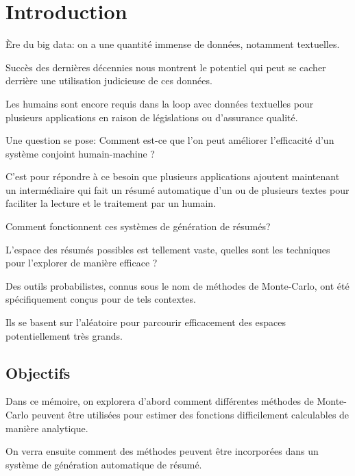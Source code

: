 \chapter*{Introduction}
\label{chap:introduction}       %


Ère du big data: on a une quantité immense de données, notamment textuelles.

Succès des dernières décennies nous montrent le potentiel qui peut se cacher
derrière une utilisation judicieuse de ces données.

Les humains sont encore requis dans la loop avec données textuelles pour
plusieurs applications en raison de législations ou d'assurance qualité.

Une question se pose: Comment est-ce que l'on peut améliorer l'efficacité d'un système
conjoint humain-machine ?

C'est pour répondre à ce besoin que plusieurs applications ajoutent maintenant
un intermédiaire qui fait un résumé automatique d'un ou de plusieurs textes pour
faciliter la lecture et le traitement par un humain.

Comment fonctionnent ces systèmes de génération de résumés?

L'espace des résumés possibles est tellement vaste, quelles sont les techniques pour
l'explorer de manière efficace ?

Des outils probabilistes, connus sous le nom de méthodes de Monte-Carlo, ont été
spécifiquement conçus pour de tels contextes.

Ils se basent sur l'aléatoire pour parcourir efficacement des espaces potentiellement
très grands.

\section*{Objectifs}

Dans ce mémoire, on explorera d'abord comment différentes méthodes de Monte-Carlo
peuvent être utilisées pour estimer des fonctions difficilement calculables de
manière analytique.

On verra ensuite comment des méthodes peuvent être incorporées dans un système
de génération automatique de résumé.


